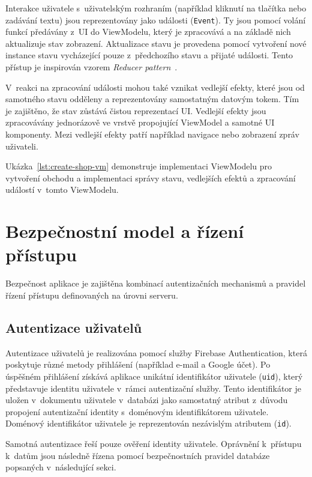 Interakce uživatele s~uživatelským rozhraním (například kliknutí na tlačítka nebo zadávání textu) jsou reprezentovány jako události (\texttt{Event}).
Ty jsou pomocí volání funkcí předávány z~UI do ViewModelu, který je zpracovává a na základě nich aktualizuje stav zobrazení.
Aktualizace stavu je provedena pomocí vytvoření nové instance stavu vycházející pouze z~předchozího stavu a přijaté události.
Tento přístup je inspirován vzorem \textit{Reducer pattern}~\parencite{redux_reducer_pattern}.

V~reakci na zpracování události mohou také vznikat vedlejší efekty, které jsou od samotného stavu odděleny a reprezentovány samostatným datovým tokem.
Tím je zajištěno, že stav zůstává čistou reprezentací UI\@.
Vedlejší efekty jsou zpracovávány jednorázově ve vrstvě propojující ViewModel a samotné UI komponenty.
Mezi vedlejší efekty patří například navigace nebo zobrazení zpráv uživateli.

Ukázka~\ref{lst:create-shop-vm} demonstruje implementaci ViewModelu pro vytvoření obchodu a implementaci správy stavu, vedlejších efektů a zpracování událostí v~tomto ViewModelu.


\section{Bezpečnostní model a řízení přístupu}
Bezpečnost aplikace je zajištěna kombinací autentizačních mechanismů a pravidel řízení přístupu definovaných na úrovni serveru.

\subsection{Autentizace uživatelů}\label{subsec:authentication}
Autentizace uživatelů je realizována pomocí služby Firebase Authentication, která poskytuje různé metody přihlášení (například e-mail a Google účet).
Po úspěšném přihlášení získává aplikace unikátní identifikátor uživatele (\texttt{uid}), který představuje identitu uživatele v~rámci autentizační služby.
Tento identifikátor je uložen v~dokumentu uživatele v~databázi jako samostatný atribut z~důvodu propojení autentizační identity s~doménovým identifikátorem uživatele.
Doménový identifikátor uživatele je reprezentován nezávislým atributem (\texttt{id}).

Samotná autentizace řeší pouze ověření identity uživatele.
Oprávnění k~přístupu k~datům jsou následně řízena pomocí bezpečnostních pravidel databáze popsaných v~následující sekci.

